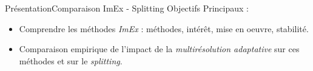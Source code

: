 \begin{frame}{Présentation}{Comparaison ImEx - Splitting}
    Objectifs Principaux : \\
    \begin{itemize}
        \item Comprendre les méthodes \emph{ImEx} : méthodes, intérêt, mise en oeuvre, stabilité.
        \item Comparaison empirique de l'impact de la \emph{multirésolution adaptative} sur ces méthodes et sur le \emph{splitting}.
    \end{itemize}
\end{frame}